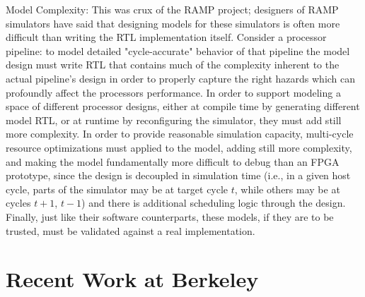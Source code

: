 Model Complexity: This was crux of the RAMP project; designers of RAMP simulators have said that
designing models for these simulators is often more difficult than writing the RTL implementation itself.
Consider a processor pipeline: to model detailed "cycle-accurate" behavior of that pipeline
the model design must write RTL that contains much of the complexity inherent to the actual pipeline's design in order
to properly capture the right hazards which can profoundly affect the processors performance.
In order to support modeling a space of different processor designs, either at compile time by generating different model RTL, or at runtime
by reconfiguring the simulator, they must add still more complexity.
In order to provide reasonable simulation capacity, multi-cycle resource optimizations must applied to the model,
adding still more complexity, and making the model fundamentally more difficult to debug than an FPGA prototype, since
the design is decoupled in simulation time (i.e., in a given host cycle, parts of the simulator may be at target cycle $t$, while
others may be at cycles $t+1$, $t-1$) and there is additional scheduling logic through the design.
Finally, just like their software counterparts, these models, if they are to be trusted, must be validated against a real implementation. 

%
%
%
%
%
%
%
%
%


\section{Recent Work at Berkeley}

